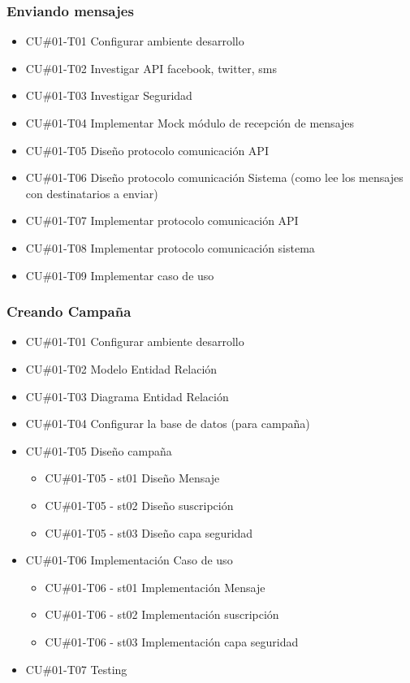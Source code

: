 \documentclass[a4paper, 11pt]{article}
\begin{document}
\subsubsection{Enviando mensajes}
\begin{itemize}
\item{CU\#01-T01} Configurar ambiente desarrollo
\item{CU\#01-T02} Investigar API facebook, twitter, sms
\item{CU\#01-T03} Investigar Seguridad
\item{CU\#01-T04} Implementar Mock m\'odulo de recepci\'on de mensajes
\item{CU\#01-T05} Dise\~no protocolo comunicaci\'on API 
\item{CU\#01-T06} Dise\~no protocolo comunicaci\'on Sistema  (como lee los mensajes con destinatarios a enviar)
\item{CU\#01-T07} Implementar protocolo comunicaci\'on API
\item{CU\#01-T08} Implementar protocolo comunicaci\'on sistema
\item{CU\#01-T09} Implementar caso de uso
\end{itemize}

\subsubsection{Creando Campa\~na}
\begin{itemize}
\item{CU\#01-T01} Configurar ambiente desarrollo
\item{CU\#01-T02} Modelo Entidad Relaci\'on
\item{CU\#01-T03} Diagrama Entidad Relaci\'on
\item{CU\#01-T04} Configurar la base de datos (para campa\~na)
\item{CU\#01-T05} Dise\~no campa\~na
\begin{itemize}
\item{CU\#01-T05 - st01} Dise\~no Mensaje
\item{CU\#01-T05 - st02} Dise\~no suscripci\'on
\item{CU\#01-T05 - st03} Dise\~no capa seguridad
\end{itemize}
\item{CU\#01-T06} Implementaci\'on Caso de uso
\begin{itemize}
\item{CU\#01-T06 - st01} Implementaci\'on Mensaje
\item{CU\#01-T06 - st02} Implementaci\'on suscripci\'on
\item{CU\#01-T06 - st03} Implementaci\'on capa seguridad
\end{itemize}
\item{CU\#01-T07} Testing
\end{itemize}
\end{document}
